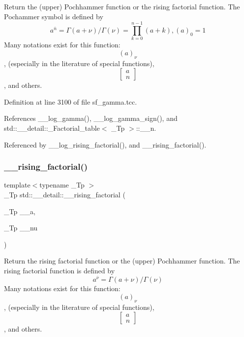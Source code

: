 Return the (upper) Pochhammer function or the rising factorial function. The Pochammer symbol is defined by \[ a^{\overline{n}} = \Gamma(a + \nu) / \Gamma(\nu) = \prod_{k=0}^{n-1} (a + k), (a)_0 = 1 \] Many notations exist for this function\+: \[ (a)_\nu \], (especially in the literature of special functions), \[ \left[ \begin{array}{c} a \\ n \end{array} \right] \], and others. 



Definition at line 3100 of file sf\+\_\+gamma.\+tcc.



References \+\_\+\+\_\+log\+\_\+gamma(), \+\_\+\+\_\+log\+\_\+gamma\+\_\+sign(), and std\+::\+\_\+\+\_\+detail\+::\+\_\+\+Factorial\+\_\+table$<$ \+\_\+\+Tp $>$\+::\+\_\+\+\_\+n.



Referenced by \+\_\+\+\_\+log\+\_\+rising\+\_\+factorial(), and \+\_\+\+\_\+rising\+\_\+factorial().

\mbox{\label{namespacestd_1_1____detail_a109a13aa776d60bdc49b1cedc0e77670}} 
\subsubsection{\texorpdfstring{\+\_\+\+\_\+rising\+\_\+factorial()}{\_\_rising\_factorial()}\hspace{0.1cm}{\footnotesize\ttfamily [2/2]}}
{\footnotesize\ttfamily template$<$typename \+\_\+\+Tp $>$ \\
\+\_\+\+Tp std\+::\+\_\+\+\_\+detail\+::\+\_\+\+\_\+rising\+\_\+factorial (\begin{DoxyParamCaption}\item[{\+\_\+\+Tp}]{\+\_\+\+\_\+a,  }\item[{\+\_\+\+Tp}]{\+\_\+\+\_\+nu }\end{DoxyParamCaption})}



Return the rising factorial function or the (upper) Pochhammer function. The rising factorial function is defined by \[ a^{\overline{\nu}} = \Gamma(a + \nu) / \Gamma(\nu) \] Many notations exist for this function\+: \[ (a)_\nu \], (especially in the literature of special functions), \[ \left[ \begin{array}{c} a \\ n \end{array} \right] \], and others. 



